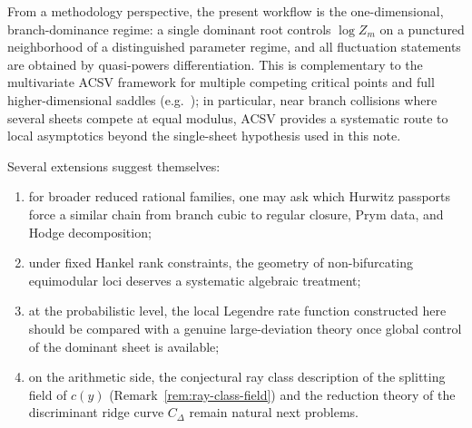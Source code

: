 From a methodology perspective, the present workflow is the one-dimensional, branch-dominance regime: a single dominant root controls \(\log Z_m\) on a punctured neighborhood of a distinguished parameter regime, and all fluctuation statements are obtained by quasi-powers differentiation.
This is complementary to the multivariate ACSV framework for multiple competing critical points and full higher-dimensional saddles (e.g.\ \cite{PemantleWilson2013}); in particular, near branch collisions where several sheets compete at equal modulus, ACSV provides a systematic route to local asymptotics beyond the single-sheet hypothesis used in this note.

Several extensions suggest themselves:
\begin{enumerate}
  \item for broader reduced rational families, one may ask which Hurwitz passports force a similar chain from branch cubic to regular closure, Prym data, and Hodge decomposition;
  \item under fixed Hankel rank constraints, the geometry of non-bifurcating equimodular loci deserves a systematic algebraic treatment;
  \item at the probabilistic level, the local Legendre rate function constructed here should be compared with a genuine large-deviation theory once global control of the dominant sheet is available;
  \item on the arithmetic side, the conjectural ray class description of the splitting field of \(c(y)\) (Remark~\ref{rem:ray-class-field}) and the reduction theory of the discriminant ridge curve \(C_\Delta\) remain natural next problems.
\end{enumerate}

